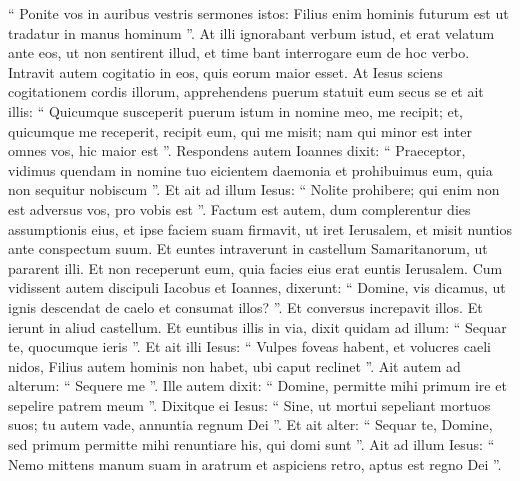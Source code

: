 \begin{biblechapter}
\begin{biblechapter}
\begin{biblechapter}
\begin{biblechapter}
\begin{biblechapter}
\begin{biblechapter}
\begin{biblechapter}
\begin{biblechapter}
\begin{biblechapter}
 \verse “ Ponite vos in auribus vestris sermones istos: Filius enim hominis futurum est ut tradatur in manus hominum ”. 
\verse At illi ignorabant verbum istud, et erat velatum ante eos, ut non sentirent illud, et time bant interrogare eum de hoc verbo. 
\verse Intravit autem cogitatio in eos, quis eorum maior esset. 
 \verse At Iesus sciens cogitationem cordis illorum, apprehendens puerum statuit eum secus se 
\verse et ait illis: “ Quicumque susceperit puerum istum in nomine meo, me recipit; et, quicumque me receperit, recipit eum, qui me misit; nam qui minor est inter omnes vos, hic maior est ”.
 \verse Respondens autem Ioannes dixit: “ Praeceptor, vidimus quendam in nomine tuo eicientem daemonia et prohibuimus eum, quia non sequitur nobiscum ”. 
\verse Et ait ad illum Iesus: “ Nolite prohibere; qui enim non est adversus vos, pro vobis est ”.
 \verse Factum est autem, dum complerentur dies assumptionis eius, et ipse faciem suam firmavit, ut iret Ierusalem, 
\verse et misit nuntios ante conspectum suum. Et euntes intraverunt in castellum Samaritanorum, ut pararent illi. 
\verse Et non receperunt eum, quia facies eius erat euntis Ierusalem. 
\verse Cum vidissent autem discipuli Iacobus et Ioannes, dixerunt: “ Domine, vis dicamus, ut ignis descendat de caelo et consumat illos? ”. 
\verse Et conversus increpavit illos. 
 \verse Et ierunt in aliud castellum.
 \verse Et euntibus illis in via, dixit quidam ad illum: “ Sequar te, quocumque ieris ”. 
\verse Et ait illi Iesus: “ Vulpes foveas habent, et volucres caeli nidos, Filius autem hominis non habet, ubi caput reclinet ”. 
\verse Ait autem ad alterum: “ Sequere me ”. Ille autem dixit: “ Domine, permitte mihi primum ire et sepelire patrem meum ”. 
\verse Dixitque ei Iesus: “ Sine, ut mortui sepeliant mortuos suos; tu autem vade, annuntia regnum Dei ”. 
\verse Et ait alter: “ Sequar te, Domine, sed primum permitte mihi renuntiare his, qui domi sunt ”. 
 \verse Ait ad illum Iesus: “ Nemo mittens manum suam in aratrum et aspiciens retro, aptus est regno Dei ”.
 

\end{biblechapter}
\end{biblechapter}
\end{biblechapter}
\end{biblechapter}
\end{biblechapter}
\end{biblechapter}
\end{biblechapter}
\end{biblechapter}
\end{biblechapter}
